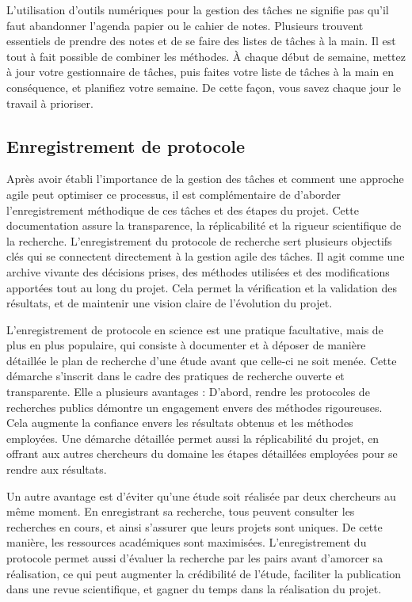 \documentclass[
  letterpaper,
  DIV=11,
  numbers=noendperiod]{scrreprt}
\begin{document}
L'utilisation d'outils numériques pour la gestion des tâches ne signifie
pas qu'il faut abandonner l'agenda papier ou le cahier de notes.
Plusieurs trouvent essentiels de prendre des notes et de se faire des
listes de tâches à la main. Il est tout à fait possible de combiner les
méthodes. À chaque début de semaine, mettez à jour votre gestionnaire de
tâches, puis faites votre liste de tâches à la main en conséquence, et
planifiez votre semaine. De cette façon, vous savez chaque jour le
travail à prioriser.

\subsection{Enregistrement de
protocole}\label{enregistrement-de-protocole}

Après avoir établi l'importance de la gestion des tâches et comment une
approche agile peut optimiser ce processus, il est complémentaire de
d'aborder l'enregistrement méthodique de ces tâches et des étapes du
projet. Cette documentation assure la transparence, la réplicabilité et
la rigueur scientifique de la recherche. L'enregistrement du protocole
de recherche sert plusieurs objectifs clés qui se connectent directement
à la gestion agile des tâches. Il agit comme une archive vivante des
décisions prises, des méthodes utilisées et des modifications apportées
tout au long du projet. Cela permet la vérification et la validation des
résultats, et de maintenir une vision claire de l'évolution du projet.

L'enregistrement de protocole en science est une pratique facultative,
mais de plus en plus populaire, qui consiste à documenter et à déposer
de manière détaillée le plan de recherche d'une étude avant que celle-ci
ne soit menée. Cette démarche s'inscrit dans le cadre des pratiques de
recherche ouverte et transparente. Elle a plusieurs avantages : D'abord,
rendre les protocoles de recherches publics démontre un engagement
envers des méthodes rigoureuses. Cela augmente la confiance envers les
résultats obtenus et les méthodes employées. Une démarche détaillée
permet aussi la réplicabilité du projet, en offrant aux autres
chercheurs du domaine les étapes détaillées employées pour se rendre aux
résultats.

Un autre avantage est d'éviter qu'une étude soit réalisée par deux
chercheurs au même moment. En enregistrant sa recherche, tous peuvent
consulter les recherches en cours, et ainsi s'assurer que leurs projets
sont uniques. De cette manière, les ressources académiques sont
maximisées. L'enregistrement du protocole permet aussi d'évaluer la
recherche par les pairs avant d'amorcer sa réalisation, ce qui peut
augmenter la crédibilité de l'étude, faciliter la publication dans une
revue scientifique, et gagner du temps dans la réalisation du projet.
\end{document}
